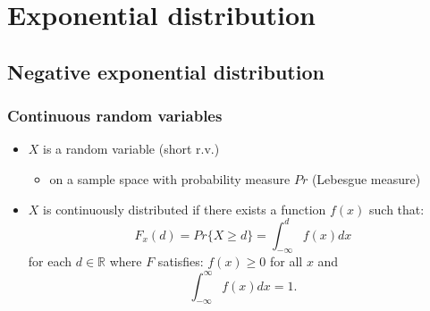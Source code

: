 \documentclass{beamer}
\begin{document}
\section{Exponential distribution}

\begin{chapterframe}
	\tableofcontents[currentsection,subsectionstyle=hide]
\end{chapterframe}

\subsection{Negative exponential distribution}

\begin{frame}
	\frametitle{Continuous random variables}
	\begin{itemize}
		\item $X$ is a random variable (short r.v.)
			\begin{itemize}
				\item on a sample space with probability measure $Pr$ (Lebesgue measure)
			\end{itemize}
		\item $X$ is \textcolor{utblue}{continuously distributed} if there exists a function $f(x)$ such that:
			{\small
			\begin{equation*}
				F_x(d)=Pr\{X\geq d\}=\int_{-\infty}^{d}f(x)dx
			\end{equation*}
			for each $d\in\mathbb{R}$ where $F$ satisfies: $f(x)\geq 0$ for all $x$ and 
			\begin{equation*}
				\int_{-\infty}^{\infty}f(x)dx=1.
			\end{equation*}}
	\end{itemize}
\end{frame}
\end{document}
